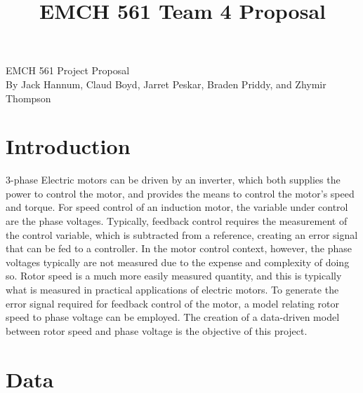 \documentclass[11pt,letterpaper]{article}
\begin{document}
\univlogo

\title{EMCH 561 Team 4 Proposal}

{\noindent\Huge EMCH 561 Project Proposal}\\[5mm]
By Jack Hannum, Claud Boyd, Jarret Peskar, Braden Priddy, and Zhymir Thompson


\section*{Introduction}

3-phase Electric motors can be driven by an inverter, which both supplies the power to control the motor, and provides the means to control the motor's speed and torque. 
For speed control of an induction motor, the variable under control are the phase voltages.
Typically, feedback control requires the measurement of the control variable, which is subtracted from a reference, creating an error signal that can be fed to a controller.
In the motor control context, however, the phase voltages typically are not measured due to the expense and complexity of doing so. 
Rotor speed is a much more easily measured quantity, and this is typically what is measured in practical applications of electric motors. 
To generate the error signal required for feedback control of the motor, a model relating rotor speed to phase voltage can be employed.
The creation of a data-driven model between rotor speed and phase voltage is the objective of this project. 

\section{Data}
\end{document}
